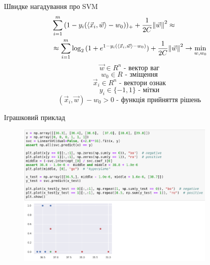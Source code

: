 \documentclass[10pt]{beamer}
\newcommand{\ip}[2]{{\langle #1, #2 \rangle}}
\begin{document}
\begin{frame}{Швидке нагадування про SVM}
\begin{align}
&\sum_{i=1}^{m}{(1 - y_{i}(\ip{\vec{x}_{i}}{\vec{w}} - w_{0}))_{+}} + \frac{1}{2C}\norm{\vec{w}}^{2} \approx \\
& \approx \sum_{i=1}^{m}{\log_{2}{(1 + e^{1- y_{i}(\ip{\vec{x}_{i}}{\vec{w}} - w_{0})})} + \frac{1}{2C}\norm{\vec{w}}^{2}}
\rightarrow \min_{w,w_{0}}
\end{align}
\begin{equation}\vec{w} \in R^{n} \text{ - вектор ваг} \end{equation}
\begin{equation}w_{0} \in R \text{ - зміщення}\end{equation}
\begin{equation}\vec{x}_{i} \in R^{n} \text{ - вектори ознак}\end{equation}
\begin{equation}y_{i} \in \{-1, 1\} \text{ - мітки}\end{equation}
\begin{equation}(\vec{x}_{i}, \vec{w}) - w_{0} > 0 \text{ - функція прийняття рішень}\end{equation}
\end{frame}


\begin{frame}{Іграшковий приклад}
    \begin{center}
        \begin{figure}
        \includegraphics[height=7cm]{images/svm-example.png}
        \end{figure}
    \end{center}
\end{frame}
\end{document}
